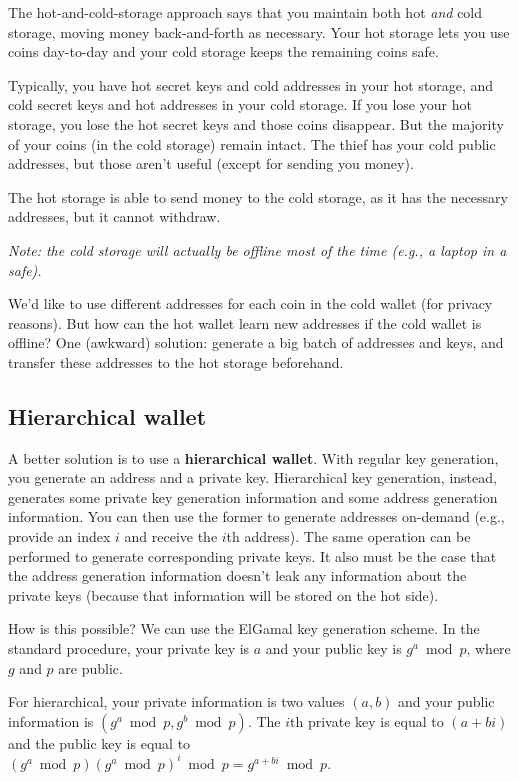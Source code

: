 \documentclass[12pt]{article}
\begin{document}
The hot-and-cold-storage approach says that you maintain both hot \textit{and} cold storage, moving money back-and-forth as necessary. Your hot storage lets you use coins day-to-day and your cold storage keeps the remaining coins safe.

Typically, you have hot secret keys and cold addresses in your hot storage, and cold secret keys and hot addresses in your cold storage. If you lose your hot storage, you lose the hot secret keys and those coins disappear. But the majority of your coins (in the cold storage) remain intact. The thief has your cold public addresses, but those aren't useful (except for sending you money).

The hot storage is able to send money to the cold storage, as it has the necessary addresses, but it cannot withdraw.

\textit{Note: the cold storage will actually be offline most of the time (e.g., a laptop in a safe).}

We'd like to use different addresses for each coin in the cold wallet (for privacy reasons). But how can the hot wallet learn new addresses if the cold wallet is offline? One (awkward) solution: generate a big batch of addresses and keys, and transfer these addresses to the hot storage beforehand.

\subsection*{Hierarchical wallet}

A better solution is to use a \textbf{hierarchical wallet}. With regular key generation, you generate an address and a private key. Hierarchical key generation, instead, generates some private key generation information and some address generation information. You can then use the former to generate addresses on-demand (e.g., provide an index $i$ and receive the $i$th address). The same operation can be performed to generate corresponding private keys. It also must be the case that the address generation information doesn't leak any information about the private keys (because that information will be stored on the hot side).

How is this possible? We can use the ElGamal key generation scheme. In the standard procedure, your private key is $a$ and your public key is $g^a \bmod{p}$, where $g$ and $p$ are public.

For hierarchical, your private information is two values $(a, b)$ and your public information is $(g^a \bmod{p}, g^b \bmod{p})$. The $i$th private key is equal to $(a + bi)$ and the public key is equal to $(g^a \bmod{p})(g^a \bmod{p})^i \bmod p = g^{a+bi} \bmod p$.
\end{document}
